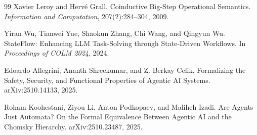 \documentclass[11pt]{article}
\begin{document}
\begin{thebibliography}{99}
Xavier Leroy and Herv\'e Grall.
\newblock Coinductive Big-Step Operational Semantics.
\newblock \emph{Information and Computation}, 207(2):284--304, 2009.

Yiran Wu, Tianwei Yue, Shaokun Zhang, Chi Wang, and Qingyun Wu.
\newblock StateFlow: Enhancing LLM Task-Solving through State-Driven Workflows.
\newblock In \emph{Proceedings of COLM 2024}, 2024.

Edoardo Allegrini, Ananth Shreekumar, and Z. Berkay Celik.
\newblock Formalizing the Safety, Security, and Functional Properties of Agentic AI Systems.
\newblock arXiv:2510.14133, 2025.

Roham Koohestani, Ziyou Li, Anton Podkopaev, and Maliheh Izadi.
\newblock Are Agents Just Automata? On the Formal Equivalence Between Agentic AI and the Chomsky Hierarchy.
\newblock arXiv:2510.23487, 2025.

\end{thebibliography}
\end{document}
